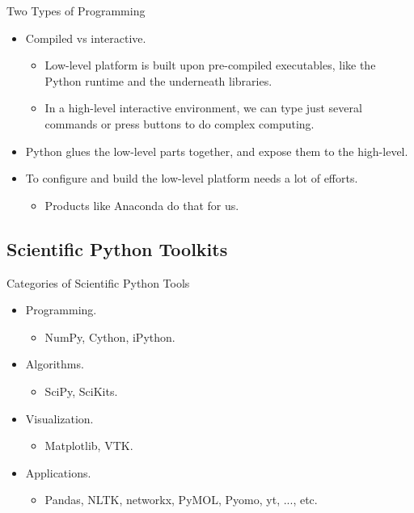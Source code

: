 \documentclass[dvips,xcolor=pst,14pt]{beamer}
\begin{document}
\begin{frame}{
%
Two Types of Programming
%
}
\begin{itemize}
  \item Compiled vs interactive.
  \begin{itemize}
    \item Low-level platform is built upon pre-compiled executables, like the
    Python runtime and the underneath libraries.
    \item In a high-level interactive environment, we can type just several
    commands or press buttons to do complex computing.
  \end{itemize}
  \item Python glues the low-level parts together, and expose them to the
  high-level.
  \item To configure and build the low-level platform needs a lot of efforts.
  \begin{itemize}
    \item Products like Anaconda do that for us.
  \end{itemize}
\end{itemize}
\end{frame}

\subsection{
Scientific Python Toolkits
}

\begin{frame}{
%
Categories of Scientific Python Tools
%
}
\begin{itemize}
  \item Programming.
  \begin{itemize}
    \item \alert{NumPy}, \alert{Cython}, \alert{iPython}.
  \end{itemize}
  \item Algorithms.
  \begin{itemize}
    \item \alert{SciPy}, SciKits.
  \end{itemize}
  \item Visualization.
  \begin{itemize}
    \item \alert{Matplotlib}, VTK.
  \end{itemize}
  \item Applications.
  \begin{itemize}
    \item Pandas, NLTK, networkx, PyMOL, Pyomo, yt, ..., etc.
  \end{itemize}
\end{itemize}
\end{frame}
\end{document}
